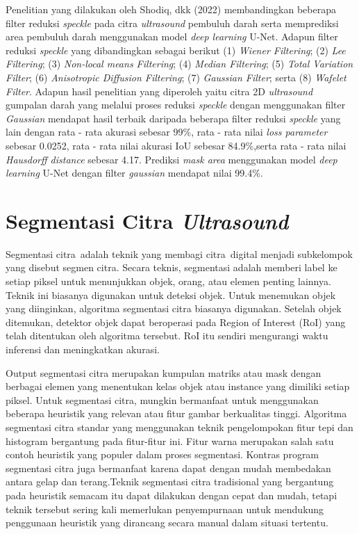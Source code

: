 Penelitian yang dilakukan oleh Shodiq, dkk (2022)\cite{shodiq2022} membandingkan beberapa filter reduksi \textit{speckle} pada citra \textit{ultrasound} pembuluh darah serta memprediksi area pembuluh darah menggunakan model \textit{deep learning} U-Net. Adapun filter reduksi \textit{speckle} yang dibandingkan sebagai berikut (1) \textit{Wiener Filtering}; (2) \textit{Lee Filtering}; (3) \textit{Non-local means Filtering}; (4) \textit{Median Filtering}; (5) \textit{Total Variation Filter}; (6) \textit{Anisotropic Diffusion Filtering}; (7) \textit{Gaussian Filter}; serta (8) \textit{Wafelet Filter}. Adapun hasil penelitian yang diperoleh yaitu citra 2D \textit{ultrasound} gumpalan darah yang melalui proses reduksi \textit{speckle} dengan menggunakan filter \textit{Gaussian} mendapat hasil terbaik daripada beberapa filter reduksi \textit{speckle} yang lain dengan rata - rata akurasi sebesar 99\%, rata - rata nilai \textit{loss parameter} sebesar 0.0252, rata - rata nilai akurasi IoU sebesar 84.9\%,serta rata - rata nilai \textit{Hausdorff distance} sebesar 4.17. Prediksi \textit{mask area} menggunakan model \textit{deep learning} U-Net dengan filter \textit{gaussian} mendapat nilai 99.4\%.



\section{Segmentasi Citra \textit{Ultrasound}}
Segmentasi citra adalah teknik yang membagi citra digital menjadi subkelompok yang disebut segmen citra. Secara teknis, segmentasi adalah memberi label ke setiap piksel untuk menunjukkan objek, orang, atau elemen penting lainnya. Teknik ini biasanya digunakan untuk deteksi objek\cite{Yanhui2019}. Untuk menemukan objek yang diinginkan, algoritma segmentasi citra biasanya digunakan. Setelah objek ditemukan, detektor objek dapat beroperasi pada Region of Interest (RoI) yang telah ditentukan oleh algoritma tersebut. RoI itu sendiri mengurangi waktu inferensi dan meningkatkan akurasi. 

Output segmentasi citra merupakan kumpulan matriks atau mask dengan berbagai elemen yang menentukan kelas objek atau instance yang dimiliki setiap piksel\cite{kurmann2021mask}. Untuk segmentasi citra, mungkin bermanfaat untuk menggunakan beberapa heuristik yang relevan atau fitur gambar berkualitas tinggi. Algoritma segmentasi citra standar yang menggunakan teknik pengelompokan fitur tepi dan histogram bergantung pada fitur-fitur ini. Fitur warna merupakan salah satu contoh heuristik yang populer dalam proses segmentasi. Kontras program segmentasi citra juga bermanfaat karena dapat dengan mudah membedakan antara gelap dan terang.Teknik segmentasi citra tradisional yang bergantung pada heuristik semacam itu dapat dilakukan dengan cepat dan mudah, tetapi teknik tersebut sering kali memerlukan penyempurnaan untuk mendukung penggunaan heuristik yang dirancang secara manual dalam situasi tertentu\cite{jena2018survey}.

